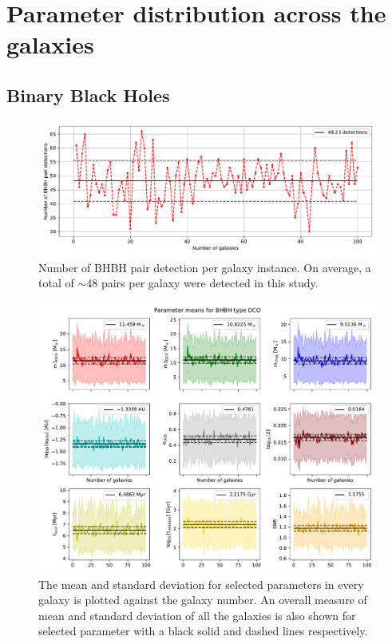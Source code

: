 \section{Parameter distribution across the galaxies}
\label{sec:paramter-distribution-across-the-galaxies}
\subsection{Binary Black Holes}
\begin{figure}[!h]
    \centering
    \includegraphics[width=\columnwidth]{analysis_data/main_analysis_folder/BHBH_n_detections}
    \caption{Number of BHBH pair detection per galaxy instance. On average, a total of $\sim$48 pairs per galaxy were detected in this study.}
    \label{fig:bhbhndetections}
\end{figure}

\begin{figure}[!h]
    \centering
    \includegraphics[width=\columnwidth]{analysis_data/main_analysis_folder/BHBH_n_galaxy_mean_plot}
    \caption{The mean and standard deviation for selected parameters in every galaxy is plotted against the galaxy number. An overall measure of mean and standard deviation of all the galaxies is also shown for selected parameter with a black solid and dashed lines respectively.}
    \label{fig:bhbh_n_galaxy_mean_plot}
\end{figure}

